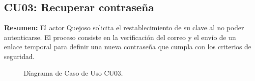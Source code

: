\begin{appendices}
\newpage

\subsection{CU03: Recuperar contraseña}

\textbf{Resumen:} 
El actor Quejoso solicita el restablecimiento de su clave al no poder autenticarse. El proceso consiste en la verificación del correo y el envío de un enlace temporal para definir una nueva contraseña que cumpla con los criterios de seguridad.

\begin{figure}[htbp]
    \centering
    \figCUtres
    \caption{Diagrama de Caso de Uso CU03.}
    \label{fig:cu03}
\end{figure}


\end{appendices}
